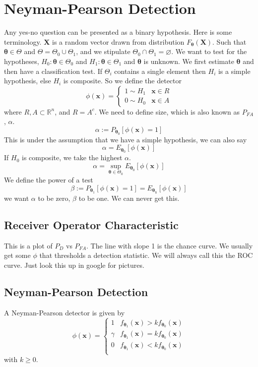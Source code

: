 \documentclass[a4paper]{article}
\begin{document}
\section*{Neyman-Pearson Detection}%
Any yes-no question can be presented as a binary hypothesis. Here is some terminology. $\bm{X}$ is a random vector drawn from distribution $F_{\bm{\theta}}(\bm{X})$. Such that $\bm{\theta} \in \Theta$ and $\Theta = \Theta_0 \cup \Theta_1$, and we stipulate $\Theta_0 \cap \Theta_1 = \varnothing$. We want to test for the hypotheses, $H_0: \bm{\theta} \in \Theta_0$ and $H_1: \bm{\theta} \in \Theta_1$ and $\bm{\theta}$ is unknown. We first estimate $\bm{\theta}$ and then have a classification test. If $\Theta_i$ contains a single element then $H_i$ is a simple hypothesis, else $H_i$ is composite. So we define the detector
\[
  \phi(\bm{x}) = 
  \begin{cases}
    1 \sim H_1 & \bm{x} \in R \\
    0 \sim H_0 & \bm{x} \in A
  \end{cases}
\]
where $R,A \subset \mathds{R}^n$, and $R = A^c$. We need to define size, which is also known as $P_{FA}$, $\alpha$. 
\[
  \alpha := P_{\bm{\theta}_0}[\phi(\bm{x}) = 1]
\]
This is under the assumption that we have a simple hypothesis, we can also say
\[
  \alpha = E_{\bm{\theta}_0} \left[ \phi(\bm{x}) \right]
\]
If $H_0$ is composite, we take the highest $\alpha$.
\[
  \alpha = \sup_{\bm{\theta} \in \Theta_0} E_{\bm{\theta}_0} \left[ \phi(\bm{x}) \right]
\]
We define the power of a test
\[
  \beta := P_{\bm{\theta}_1} \left[ \phi(\bm{x}) = 1\right] = E_{\bm{\theta_1}} \left[ \phi(\bm{x}) \right]
\]
we want $\alpha$ to be zero, $\beta$ to be one. We can never get this. 

\subsection*{Receiver Operator Characteristic}%
This is a plot of $P_D$ vs $P_{FA}$. The line with slope 1 is the chance curve. We usually get some $\phi$ that thresholds a detection statistic. We will always call this the ROC curve. Just look this up in google for pictures.

\subsection*{Neyman-Pearson Detection}%
A Neyman-Pearson detector is given by
\[
  \phi(\bm{x}) = 
  \begin{cases}
    1 & f_{\bm{\theta}_1}(\bm{x}) > kf_{\bm{\theta}_0}(\bm{x}) \\
  \gamma & f_{\bm{\theta}_1}(\bm{x}) = k f_{\bm{\theta}_0}(\bm{x}) \\
    0 & f_{\bm{\theta}_1}(\bm{x}) < k f_{\bm{\theta}_0}(\bm{x}) \\
  \end{cases}
\]
with $k \geq 0$.
\end{document}
